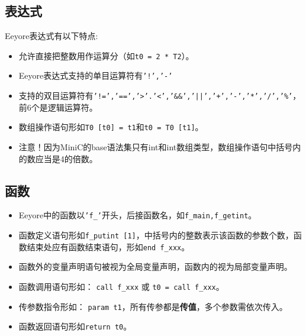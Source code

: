 \documentclass{ctexart}
\begin{document}
\subsection{表达式}


Eeyore表达式有以下特点:
\begin{itemize}

\item 
允许直接把整数用作运算分（如\texttt{t0 = 2 * T2}）。

\item
Eeyore表达式支持的单目运算符有\texttt{'!','-'}

\item 
支持的双目运算符有\texttt{'!=','==','\textgreater'.'\textless','\&\&','||','+','-','*','/','\%'}，前6个是逻辑运算符。

\item 
数组操作语句形如\texttt{T0 [t0] = t1}和\texttt{t0 = T0 [t1]}。

\item
注意！因为MiniC的base语法集只有int和int数组类型，数组操作语句中括号内的数应当是4的倍数。

\end{itemize}
\subsection{函数}
\begin{itemize}
\item 
Eeyore中的函数以\texttt{'f\_'}开头，后接函数名，如\texttt{f\_main,f\_getint}。

\item 
函数定义语句形如\texttt{f\_putint [1]}，中括号内的整数表示该函数的参数个数，函数结束处应有函数结束语句，形如\texttt{end f\_xxx}。

\item 
函数外的变量声明语句被视为全局变量声明，函数内的视为局部变量声明。

\item 
函数调用语句形如： \texttt{call f\_xxx} 或 \texttt{t0 = call f\_xxx}。

\item 
传参数指令形如： \texttt{param t1}，所有传参都是\textbf{传值}，多个参数需依次传入。

\item
函数返回语句形如\texttt{return t0}。
\end{itemize}
\end{document}

